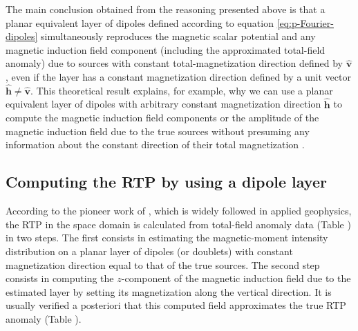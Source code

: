 The main conclusion obtained from the reasoning presented above is that a planar equivalent layer of dipoles defined according 
to equation \ref{eq:p-Fourier-dipoles} simultaneously 
reproduces the magnetic scalar potential and any magnetic induction field component (including the approximated total-field anomaly) 
due to sources with constant total-magnetization direction defined by $\hat{\mathbf{v}}$, even if the layer has a constant magnetization 
direction defined by a unit vector $\hat{\mathbf{h}} \ne \hat{\mathbf{v}}$. 
This theoretical result explains, for example, why we can use a planar equivalent layer of dipoles with arbitrary constant 
magnetization direction $\hat{\mathbf{h}}$ to compute the magnetic induction field components or the amplitude of the magnetic induction field due to the true sources 
without presuming any information about the constant direction of their total magnetization 
\citep[e.g,][]{li_etal_2021}.


\subsection{Computing the RTP by using a dipole layer}


According to the pioneer work of \citet{silva1986}, which is widely followed in applied geophysics, 
the RTP in the space domain is calculated from total-field anomaly data (Table ) in two steps.
The first consists in estimating the magnetic-moment intensity distribution on a planar layer 
of dipoles (or doublets) with constant magnetization direction equal to that of the true sources.
The second step consists in computing the $z$-component of the magnetic induction field due 
to the estimated layer by setting its magnetization along the vertical direction.
It is usually verified a posteriori that this computed field approximates the true RTP anomaly (Table ).

